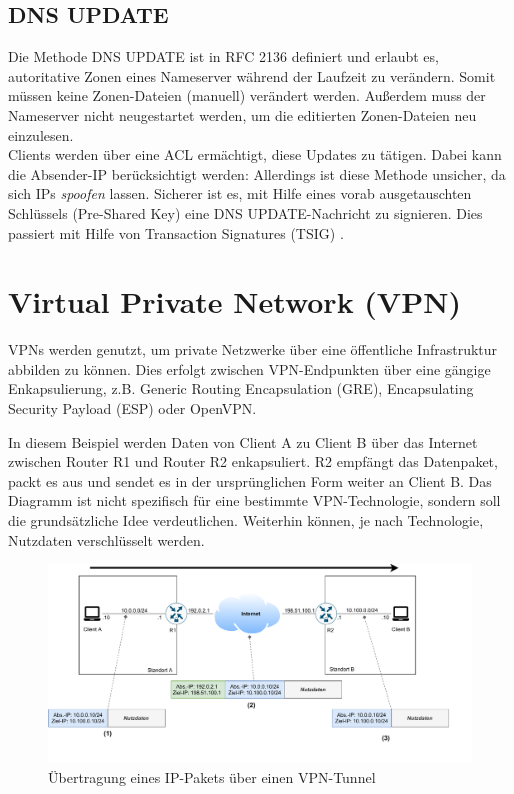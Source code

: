 \subsection{DNS UPDATE}
Die Methode DNS UPDATE ist in RFC 2136 definiert und erlaubt es, autoritative Zonen eines Nameserver während der Laufzeit zu verändern. Somit müssen keine Zonen-Dateien (manuell) verändert werden. Außerdem muss der Nameserver nicht neugestartet werden, um die editierten Zonen-Dateien neu einzulesen.\\
Clients werden über eine ACL ermächtigt, diese Updates zu tätigen. Dabei kann die Absender-IP berücksichtigt werden: Allerdings ist diese Methode unsicher, da sich IPs \textit{spoofen} lassen. Sicherer ist es, mit Hilfe eines vorab ausgetauschten Schlüssels (Pre-Shared Key) eine DNS UPDATE-Nachricht zu signieren. Dies passiert mit Hilfe von Transaction Signatures (TSIG) \cite[S.911-914]{Fall2011}.

\section{Virtual Private Network (VPN)}\label{vpn}
VPNs werden genutzt, um private Netzwerke über eine öffentliche Infrastruktur abbilden zu können. Dies erfolgt zwischen VPN-Endpunkten über eine gängige Enkapsulierung, z.B. Generic Routing Encapsulation (GRE), Encapsulating Security Payload (ESP) oder OpenVPN.

In diesem Beispiel werden Daten von Client A zu Client B über das Internet zwischen Router R1 und Router R2 enkapsuliert. R2 empfängt das Datenpaket, packt es aus und sendet es in der ursprünglichen Form weiter an Client B. Das Diagramm ist nicht spezifisch für eine bestimmte VPN-Technologie, sondern soll die grundsätzliche Idee verdeutlichen. Weiterhin können, je nach Technologie, Nutzdaten verschlüsselt werden. 

\begin{figure}[h]
  \centering
  \includegraphics[scale=0.75]{Figures/vpn-example.pdf}
  \caption{Übertragung eines IP-Pakets über einen VPN-Tunnel}
  \label{grafik: vpn-example}
\end{figure}\FloatBarrier


